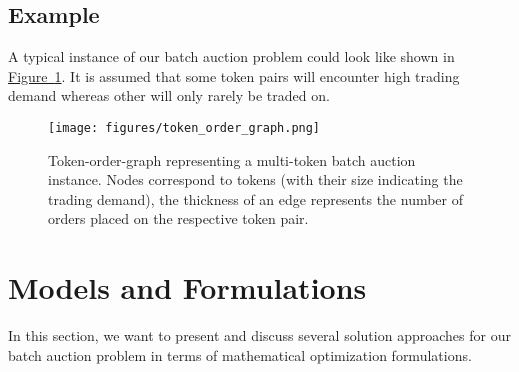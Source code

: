 \documentclass[11pt,parskip=full]{scrartcl}%
\newcommand*{\figref}[1]{\hyperref[{#1}]{Figure~\ref*{#1}}}
\begin{document}
\begin{comment}
\paragraph{Properties}

Here is a list of research questions that we would like to answer.

\begin{itemize}
  \item In an optimal solution, is it guaranteed that orders can always be fully executed if their
  limit prices are strictly higher (buy order) or lower (sell order) than the exchange rate between
  the respective token pair?
  If true, we would only need to resort to partially executing orders if the execution price is
  equal to the limit price.
  \item What is the impact of optimizing the trading volume vs. the traders' welfare?
\end{itemize}
\end{comment}

\newpage
\subsection{Example}

A typical instance of our batch auction problem could look like shown in 
\figref{fig:order-token-graph}.
It is assumed that some token pairs will encounter high trading demand whereas other will only
rarely be traded on.

\begin{figure}[h!]
  \centering
  \texttt{[image: figures/token\_order\_graph.png]}
  \caption{Token-order-graph representing a multi-token batch auction instance. Nodes correspond
  to tokens (with their size indicating the trading demand), the thickness of an edge represents 
  the number of orders placed on the respective token pair.}
  \label{fig:order-token-graph}
\end{figure}


\clearpage
\section{Models and Formulations}
\label{sec:models}

In this section, we want to present and discuss several solution approaches for our batch auction
problem in terms of mathematical optimization formulations.

\vspace{-.2cm}
\end{document}
